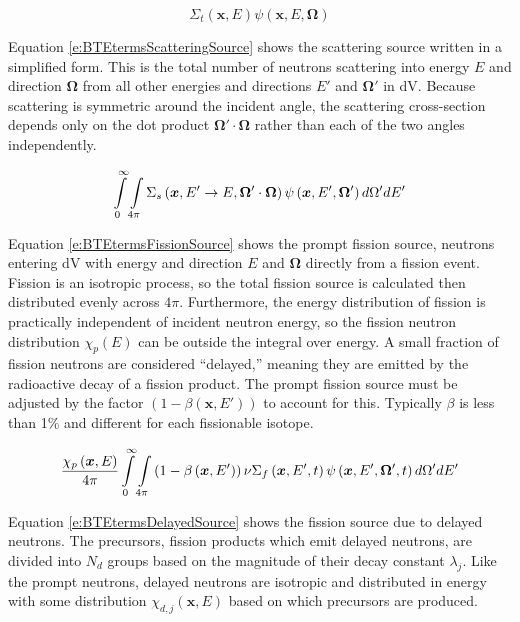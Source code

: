 \begin{equation}\label{e:BTEtermsTotalRR}
\Sigma_t\left(\bm x,E\right)\psi\left(\bm x,E,\bm\Omega\right)
\end{equation}

Equation \ref{e:BTEtermsScatteringSource} shows the scattering source written in a simplified form.  This is the total number of neutrons scattering into energy $E$ and direction $\bm\Omega$ from all other energies and directions $E'$ and $\bm\Omega'$ in dV.  Because scattering is symmetric around the incident angle, the scattering cross-section depends only on the dot product $\bm\Omega'\cdot\bm\Omega$ rather than each of the two angles independently.

\begin{equation}\label{e:BTEtermsScatteringSource}
\intop_0^{\infty} \intop_{4\pi} \Sigma_s\left(\bm x,E' \rightarrow E, \bm \Omega' \cdot \bm \Omega\right) \psi\left(\bm x,E',\bm \Omega'\right) d\Omega' dE'
\end{equation}

Equation \ref{e:BTEtermsFissionSource} shows the prompt fission source, neutrons entering dV with energy and direction $E$ and $\bm\Omega$ directly from a fission event.  Fission is an isotropic process, so the total fission source is calculated then distributed evenly across $4\pi$.  Furthermore, the energy distribution of fission is practically independent of incident neutron energy, so the fission neutron distribution $\chi_p\left(E\right)$ can be outside the integral over energy.  A small fraction of fission neutrons are considered ``delayed,'' meaning they are emitted by the radioactive decay of a fission product.  The prompt fission source must be adjusted by the factor $\left(1-\beta\left(\bm x,E'\right)\right)$ to account for this.  Typically $\beta$ is less than 1\% and different for each fissionable isotope.

\begin{equation}\label{e:BTEtermsFissionSource}
{\frac{\chi_p\left(\bm x,E\right)}{4\pi} \intop_0^{\infty} \intop_{4\pi} \left(1 - \beta\left(\bm x,E'\right)\right) \nu \Sigma_f\left(\bm x,E',t\right) \psi\left(\bm x,E',\bm \Omega',t\right) d\Omega' dE'}
\end{equation}

Equation \ref{e:BTEtermsDelayedSource} shows the fission source due to delayed neutrons.  The precursors, fission products which emit delayed neutrons, are divided into $N_d$ groups based on the magnitude of their decay constant $\lambda_j$.  Like the prompt neutrons, delayed neutrons are isotropic and distributed in energy with some distribution $\chi_{d,j}\left(\bm x,E\right)$ based on which precursors are produced.

